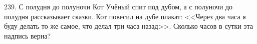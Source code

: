 239. С полудня до полуночи Кот Учёный спит под дубом, а с полуночи до полудня рассказывает сказки. Кот повесил на дубе плакат: <<Через два часа я буду делать то же самое, что делал три часа назад>>. Сколько часов в сутки эта надпись верна?\\
